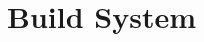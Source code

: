 \documentclass[crop=false]{standalone}
\begin{document}
  \section{Build System} %
  \label{sec:build_system}

    \cite{fog2018a}

\end{document}
